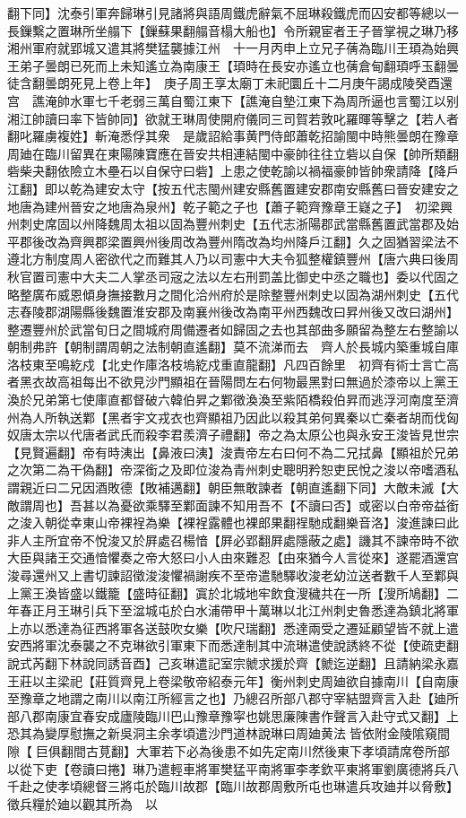 翻下同】沈泰引軍奔歸琳引見諸將與語周鐵虎辭氣不屈琳殺鐵虎而囚安都等總以一長鏁繫之置琳所坐䑽下【鏁蘇果翻䑽音榻大船也】令所親宦者王子晉掌視之琳乃移湘州軍府就郢城又遣其將樊猛襲據江州　十一月丙申上立兄子蒨為臨川王頊為始興王弟子曇朗已死而上未知遙立為南康王【頊時在長安亦遙立也蒨倉甸翻頊呼玉翻曇徒含翻曇朗死見上卷上年】　庚子周王享太廟丁未祀圜丘十二月庚午謁成陵癸酉還宫　譙淹帥水軍七千老弱三萬自蜀江東下【譙淹自墊江東下為周所逼也言蜀江以别湘江帥讀曰率下皆帥同】欲就王琳周使開府儀同三司賀若敦叱羅暉等擊之【若人者翻叱羅虜複姓】斬淹悉俘其衆　是歲詔給事黄門侍郎蕭乾招諭閩中時熊曇朗在豫章周廸在臨川留異在東陽陳寶應在晉安共相連結閩中豪帥往往立砦以自保【帥所類翻砦柴夬翻依險立木壘石以自保守曰砦】上患之使乾諭以禍福豪帥皆帥衆請降【降戶江翻】即以乾為建安太守【按五代志閩州建安縣舊置建安郡南安縣舊曰晉安建安之地唐為建州晉安之地唐為泉州】乾子範之子也【蕭子範齊豫章王嶷之子】　初梁興州刺史席固以州降魏周太祖以固為豐州刺史【五代志浙陽郡武當縣舊置武當郡及始平郡後改為齊興郡梁置興州後周改為豐州隋改為均州降戶江翻】久之固猶習梁法不遵北方制度周人密欲代之而難其人乃以司憲中大夫令狐整權鎮豐州【唐六典曰後周秋官置司憲中大夫二人掌丞司宼之法以左右刑罰盖比御史中丞之職也】委以代固之略整廣布威恩傾身撫接數月之間化洽州府於是除整豐州刺史以固為湖州刺史【五代志舂陵郡湖陽縣後魏置淮安郡及南襄州後改為南平州西魏改曰昇州後又改曰湖州】整遷豐州於武當旬日之間城府周備遷者如歸固之去也其部曲多願留為整左右整諭以朝制弗許【朝制謂周朝之法制朝直遙翻】莫不流涕而去　齊人於長城内築重城自庫洛枝東至鳴紇戍【北史作庫洛枝塢紇戍重直龍翻】凡四百餘里　初齊有術士言亡高者黑衣故高祖每出不欲見沙門顯祖在晉陽問左右何物最黑對曰無過於漆帝以上黨王渙於兄弟第七使庫直都督破六韓伯昇之鄴徵渙渙至紫陌橋殺伯昇而逃浮河南度至濟州為人所執送鄴【黑者宇文戎衣也齊顯祖乃因此以殺其弟何異秦以亡秦者胡而伐匈奴唐太宗以代唐者武氏而殺李君羨濟子禮翻】帝之為太原公也與永安王浚皆見世宗【見賢遍翻】帝有時洟出【鼻液曰洟】浚責帝左右曰何不為二兄拭鼻【顯祖於兄弟之次第二為干偽翻】帝深銜之及即位浚為青州刺史聰明矜恕吏民悅之浚以帝嗜酒私謂親近曰二兄因酒敗德【敗補邁翻】朝臣無敢諫者【朝直遙翻下同】大敵未滅【大敵謂周也】吾甚以為憂欲乘驛至鄴面諫不知用吾不【不讀曰否】或密以白帝帝益銜之浚入朝從幸東山帝裸裎為樂【裸裎露體也裸郎果翻䄇馳成翻樂音洛】浚進諫曰此非人主所宜帝不悅浚又於屛處召楊愔【屛必郢翻屛處隱蔽之處】譏其不諫帝時不欲大臣與諸王交通愔懼奏之帝大怒曰小人由來難忍【由來猶今人言從來】遂罷酒還宫浚尋還州又上書切諫詔徵浚浚懼禍謝疾不至帝遣馳驛收浚老幼泣送者數千人至鄴與上黨王渙皆盛以鐵籠【盛時征翻】寘於北城地牢飲食溲穢共在一所【溲所鳩翻】二年春正月王琳引兵下至湓城屯於白水浦帶甲十萬琳以北江州刺史魯悉達為鎮北將軍上亦以悉達為征西將軍各送鼓吹女樂【吹尺瑞翻】悉達兩受之遷延顧望皆不就上遣安西將軍沈泰襲之不克琳欲引軍東下而悉達制其中流琳遣使說誘終不從【使疏吏翻說式芮翻下林說同誘音酉】己亥琳遣記室宗虩求援於齊【虩迄逆翻】且請納梁永嘉王莊以主梁祀【莊質齊見上卷梁敬帝紹泰元年】衡州刺史周廸欲自據南川【自南康至豫章之地謂之南川以南江所經言之也】乃總召所部八郡守宰結盟齊言入赴【廸所部八郡南康宜春安成廬陵臨川巴山豫章豫寜也姚思廉陳書作聲言入赴守式又翻】上恐其為變厚慰撫之新吳洞主余孝頃遣沙門道林說琳曰周廸黄法皆依附金陵隂窺間隙【巨俱翻間古莧翻】大軍若下必為後患不如先定南川然後東下孝頃請席卷所部以從下吏【卷讀曰捲】琳乃遣輕車將軍樊猛平南將軍李孝欽平東將軍劉廣德將兵八千赴之使孝頃總督三將屯於臨川故郡【臨川故郡周敷所屯也琳遣兵攻廸并以脅敷】徵兵糧於廸以觀其所為　以